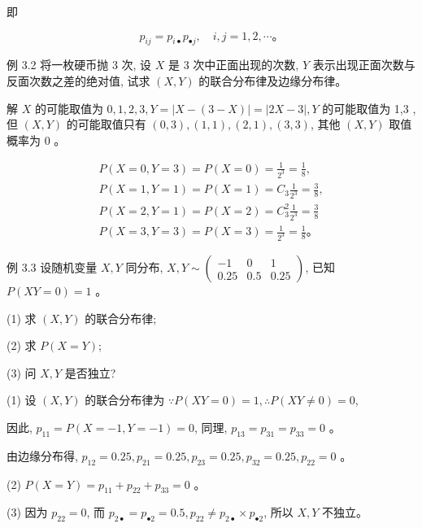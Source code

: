 \documentclass{beamer}
\begin{document}
	\begin{frame}
		即
		
		$$
		p_{i j}=p_{i \bullet} p_{\bullet j}, \quad i, j=1,2, \cdots 。
		$$
		
		例 3.2 将一枚硬币抛 3 次, 设 $X$ 是 3 次中正面出现的次数, $Y$ 表示出现正面次数与 反面次数之差的绝对值, 试求 $(X, Y)$ 的联合分布律及边缘分布律。
	\end{frame}
	
	\begin{frame}
		解 $X$ 的可能取值为 $0,1,2,3, Y=|X-(3-X)|=|2 X-3|, Y$ 的可能取值为 1,3 , 但 $(X, Y)$ 的可能取值只有 $(0,3),(1,1),(2,1),(3,3)$, 其他 $(X, Y)$ 取值概率为 0 。
		
		$$
		\begin{gathered}
			P(X=0, Y=3)=P(X=0)=\frac{1}{2^{3}}=\frac{1}{8}, \\
			P(X=1, Y=1)=P(X=1)=C_{3} \frac{1}{2^{3}}=\frac{3}{8}, \\
			P(X=2, Y=1)=P(X=2)=C_{3}^{2} \frac{1}{2^{3}}=\frac{3}{8} \\
			P(X=3, Y=3)=P(X=3)=\frac{1}{2^{3}}=\frac{1}{8} 。
		\end{gathered}
		$$
	\end{frame}
	
	\begin{frame}
		例 3.3 设随机变量 $X, Y$ 同分布, $X, Y \sim\left(\begin{array}{ccc}-1 & 0 & 1 \\ 0.25 & 0.5 & 0.25\end{array}\right)$, 已知 $P(X Y=0)=1$ 。
		
		(1) 求 $(X, Y)$ 的联合分布律;
		
		(2) 求 $P(X=Y)$;
		
		(3) 问 $X, Y$ 是否独立?
	\end{frame}
	
	\begin{frame}
		 (1) 设 $(X, Y)$ 的联合分布律为 $\because P(X Y=0)=1, \therefore P(X Y \neq 0)=0$,
		
		因此, $p_{11}=P(X=-1, Y=-1)=0$, 同理, $p_{13}=p_{31}=p_{33}=0$ 。
		
		由边缘分布得, $p_{12}=0.25, p_{21}=0.25, p_{23}=0.25, p_{32}=0.25, p_{22}=0$ 。
		
		(2) $P(X=Y)=p_{11}+p_{22}+p_{33}=0$ 。
		
		(3) 因为 $p_{22}=0$, 而 $p_{2 \bullet}=p_{\bullet 2}=0.5, p_{22} \neq p_{2 \bullet} \times p_{\bullet 2}$, 所以 $X, Y$ 不独立。
	\end{frame}
	
\end{document}
